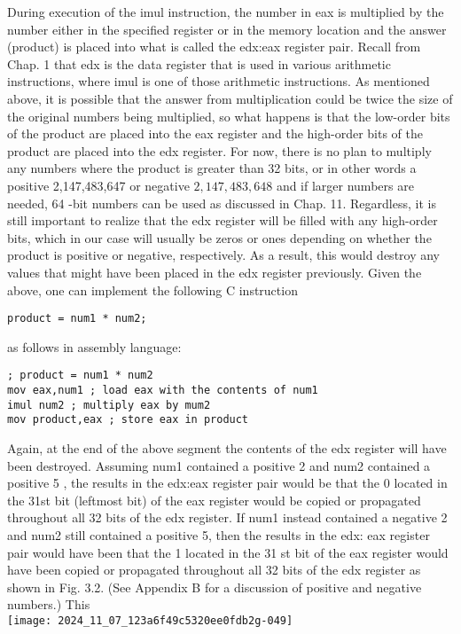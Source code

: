 \documentclass[10pt]{article}
\begin{document}
During execution of the imul instruction, the number in eax is multiplied by the number either in the specified register or in the memory location and the answer (product) is placed into what is called the edx:eax register pair. Recall from Chap. 1 that edx is the data register that is used in various arithmetic instructions, where imul is one of those arithmetic instructions. As mentioned above, it is possible that the answer from multiplication could be twice the size of the original numbers being multiplied, so what happens is that the low-order bits of the product are placed into the eax register and the high-order bits of the product are placed into the edx register. For now, there is no plan to multiply any numbers where the product is greater than 32 bits, or in other words a positive 2,147,483,647 or negative $2,147,483,648$ and if larger numbers are needed, 64 -bit numbers can be used as discussed in Chap. 11. Regardless, it is still important to realize that the edx register will be filled with any high-order bits, which in our case will usually be zeros or ones depending on whether the product is positive or negative, respectively. As a result, this would destroy any values that might have been placed in the edx register previously. Given the above, one can implement the following C instruction

\begin{verbatim}
product = num1 * num2;
\end{verbatim}

as follows in assembly language:

\begin{verbatim}
; product = num1 * num2
mov eax,num1 ; load eax with the contents of num1
imul num2 ; multiply eax by mum2
mov product,eax ; store eax in product
\end{verbatim}

Again, at the end of the above segment the contents of the edx register will have been destroyed. Assuming num1 contained a positive 2 and num2 contained a positive 5 , the results in the edx:eax register pair would be that the 0 located in the 31st bit (leftmost bit) of the eax register would be copied or propagated throughout all 32 bits of the edx register. If num1 instead contained a negative 2 and num2 still contained a positive 5, then the results in the edx: eax register pair would have been that the 1 located in the 31 st bit of the eax register would have been copied or propagated throughout all 32 bits of the edx register as shown in Fig. 3.2. (See Appendix B for a discussion of positive and negative numbers.) This\\
\texttt{[image: 2024\_11\_07\_123a6f49c5320ee0fdb2g-049]}
\end{document}
